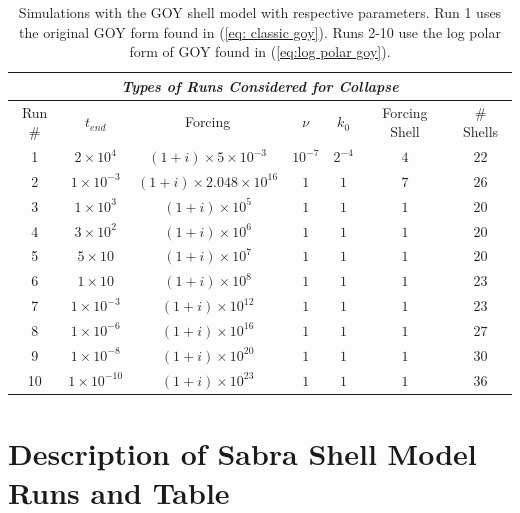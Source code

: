 \begin{table}[!htp]
        \begin{center}
        \caption{Simulations with the GOY shell model with respective parameters. Run 1 uses the original GOY form found in (\ref{eq: classic goy}).  Runs 2-10 use the log polar form of GOY found in (\ref{eq:log polar goy}).}
        \begin{tabular}{||c|c|c|c|c|c|c||} \hline	
        \multicolumn{7}{|c|}{\emph{Types of Runs Considered for Collapse}} \\ \hline \hline
        Run $\#$    &$t_{end}$         &Forcing 			&$\nu$ 	   &$k_{0}$ &Forcing Shell &$\#$ Shells\\ \hline \hline
        1 & $2\times10^4$   &$(1+i)\times5\times10^{-3}$   &$10^{-7}$&$2^{-4}$ &$4$ &$22$\\
        2 &$1\times10^{-3}$ &$(1+i)\times2.048\times10^{16}$&$1$ 	   &$1$      &$7$ &$26$\\
        3 &$1\times10^{3}$ &$(1+i)\times10^{5}$		      &$1$	   &$1$	     &$1$ &$20$\\
        4 &$3\times10^{2}$ &$(1+i)\times10^{6}$	          &$1$	   &$1$	     &$1$ &$20$\\
        5 &$5\times10$ &$(1+i)\times10^{7}$		      &$1$	   &$1$	     &$1$ &$20$\\
        6 &$1\times10$ &$(1+i)\times10^{8}$  	      &$1$ 	   &$1$      &$1$ &$23$\\
        7 &$1\times10^{-3}$ &$(1+i)\times10^{12}$  	      &$1$ 	   &$1$      &$1$ &$23$\\
        8 &$1\times10^{-6}$ &$(1+i)\times10^{16}$  	      &$1$ 	   &$1$      &$1$ &$27$\\
        9 &$1\times10^{-8}$ &$(1+i)\times10^{20}$  	      &$1$     &$1$      &$1$ &$30$\\
        10&$1\times10^{-10}$ &$(1+i)\times10^{23}$	          &$1$	   &$1$      &$1$ &$36$\\
         \hline \hline
        \end{tabular}
        \end{center}
        \label{table: app GOY table}
\end{table}


\section{Description of Sabra Shell Model Runs and Table}

